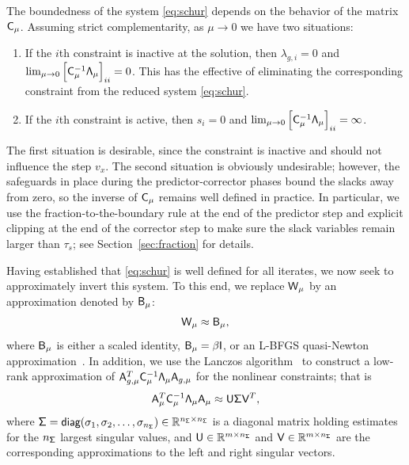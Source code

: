 The boundedness of the system \eqref{eq:schur} depends on the behavior of the
matrix $\mathsf{C}_{\mu}$.  Assuming strict complementarity, as $\mu\rightarrow 0$
we have two situations:
\begin{enumerate}
\item If the $i$th constraint is inactive at the solution, then $\lambda_{g,i} = 0$ and
  \\ $\lim_{\mu\rightarrow 0} \left[\mathsf{C}_\mu^{-1} \mathsf{\Lambda}_\mu \right]_{ii}
  = 0$.  This has the effective of eliminating the corresponding constraint from
  the reduced system \eqref{eq:schur}.

\item If the $i$th constraint is active, then $s_i = 0$ and $\lim_{\mu\rightarrow 0}
  \left[\mathsf{C}_\mu^{-1} \mathsf{\Lambda}_\mu \right]_{ii} = \infty$.
\end{enumerate}
The first situation is desirable, since the constraint is inactive and should
not influence the step $v_x$.  The second situation is obviously undesirable;
however, the safeguards in place during the predictor-corrector phases bound the
slacks away from zero, so the inverse of $\mathsf{C}_{\mu}$ remains well defined in practice.
In particular, we use the fraction-to-the-boundary rule 
at the end of the predictor step and explicit clipping at the end of the corrector step to make sure 
the slack variables remain larger than $\tau_s$; see Section~\ref{sec:fraction} for details.



Having established that \eqref{eq:schur} is well defined for all iterates, we
now seek to approximately invert this system.  To this end, we replace
$\mathsf{W}_{\mu}$ by an approximation denoted by $\mathsf{B}_{\mu}$:
\begin{equation*}
\mathsf{W}_{\mu} \approx \mathsf{B}_{\mu},
\end{equation*}
where $\mathsf{B}_{\mu}$ is either a scaled identity, $\mathsf{B}_{\mu} = \beta
\mathsf{I}$, or an L-BFGS quasi-Newton approximation~\cite{liu:1989}.  In addition,
we use the Lanczos algorithm~\cite{saad:1992} to construct a low-rank
approximation of $\mathsf{A}_{g,\mu}^T \mathsf{C}_\mu^{-1} \mathsf{\Lambda}_\mu
\mathsf{A}_{g,\mu}$ for the nonlinear constraints; that is
\begin{equation}\label{eq:svd}
  \mathsf{A}_\mu^T  \mathsf{C}_\mu^{-1}  \mathsf{\Lambda}_{\mu}\mathsf{A}_\mu
  \approx \mathsf{U} \mathsf{\Sigma} \mathsf{V}^T,
\end{equation}
where $\mathsf{\Sigma} = \textsf{diag}(\sigma_1,\sigma_2,\ldots,\sigma_{n_{\mathsf{\Sigma}}}) \in
\mathbb{R}^{n_{\mathsf{\Sigma}}\times n_{\mathsf{\Sigma}}}$ is a diagonal matrix holding estimates for the
$n_{\mathsf{\Sigma}}$ largest singular values, and $\mathsf{U} \in \mathbb{R}^{m\times n_{\mathsf{\Sigma}}}$ and
$\mathsf{V} \in \mathbb{R}^{m\times n_{\mathsf{\Sigma}}}$ are the corresponding approximations to the
left and right singular vectors. 

